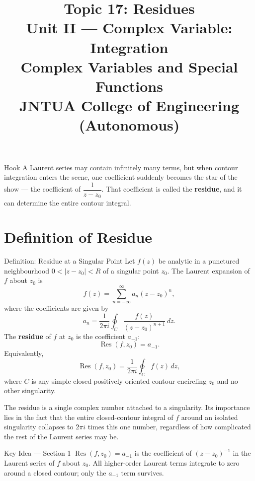 \documentclass[12pt,a4paper]{article}
\title{\textbf{Topic 17: Residues}\\
\large Unit II --- Complex Variable: Integration\\
Complex Variables and Special Functions\\
JNTUA College of Engineering (Autonomous)}
\author{}
\date{}
\begin{document}
\maketitle
\tableofcontents
\newpage

\begin{curiositybox}{Hook}
A Laurent series may contain infinitely many terms, but when contour integration enters the scene,
one coefficient suddenly becomes the star of the show --- the coefficient of $\dfrac{1}{z - z_0}$.
That coefficient is called the \textbf{residue}, and it can determine the entire contour integral.
\end{curiositybox}

\section{Definition of Residue}

\begin{infobox}{Definition: Residue at a Singular Point}
Let $f(z)$ be analytic in a punctured neighbourhood $0 < |z - z_0| < R$ of a singular point $z_0$.
The Laurent expansion of $f$ about $z_0$ is
\[
   f(z) = \sum_{n=-\infty}^{\infty} a_n (z - z_0)^n,
\]
where the coefficients are given by
\[
   a_n = \frac{1}{2\pi i} \oint_{C} \frac{f(z)}{(z-z_0)^{n+1}}\,dz.
\]
The \textbf{residue} of $f$ at $z_0$ is the coefficient $a_{-1}$:
\[
   \operatorname{Res}(f, z_0) = a_{-1}.
\]
Equivalently,
\[
   \operatorname{Res}(f, z_0)
   = \frac{1}{2\pi i}\oint_{C} f(z)\,dz,
\]
where $C$ is any simple closed positively oriented contour encircling $z_0$ and no other singularity.
\end{infobox}

The residue is a single complex number attached to a singularity. Its importance lies in the fact that
the entire closed-contour integral of $f$ around an isolated singularity collapses to $2\pi i$ times
this one number, regardless of how complicated the rest of the Laurent series may be.

\begin{learnbox}{Key Idea --- Section 1}
$\operatorname{Res}(f,z_0) = a_{-1}$ is the coefficient of $(z-z_0)^{-1}$ in the Laurent
series of $f$ about $z_0$.  All higher-order Laurent terms integrate to zero around a closed
contour; only the $a_{-1}$ term survives.
\end{learnbox}
\end{document}
